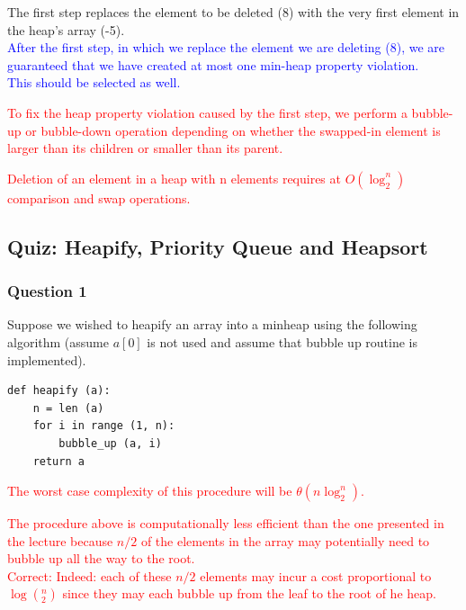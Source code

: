 \documentclass{article}
\begin{document}
The first step replaces the element to be deleted (8) with the very first element in the heap's array (-5).\\

\textcolor{blue}{After the first step, in which we replace the element we are deleting (8), we are guaranteed that we have created at most one min-heap property violation.\\
This should be selected as well.\\}

\textcolor{red}{To fix the heap property violation caused by the first step, we perform a bubble-up or bubble-down operation depending on whether the swapped-in element is larger than its children or smaller than its parent.\\}

\textcolor{red}{Deletion of an element in a heap with n elements requires at $O(\log_2^n)$ comparison and swap operations.\\}


\subsection{Quiz: Heapify, Priority Queue and Heapsort}


\subsubsection{Question 1}

Suppose we wished to heapify  an array into a minheap using the following algorithm (assume $a[0]$ is not used and assume that bubble up routine is implemented).\\

\begin{verbatim}
def heapify (a):
    n = len (a)
    for i in range (1, n):
        bubble_up (a, i)
    return a
\end{verbatim}

\textcolor{red}{The worst case complexity of this procedure will be $\theta(n\log_2^n)$.\\}

\textcolor{red}{The procedure above is computationally less efficient than the one presented in the lecture because $n/2$ of the elements in the array may potentially need to bubble up all the way to the root.\\
Correct: Indeed: each of these $n/2$ elements may incur a cost proportional to $\log(_2^n)$ since they may each bubble up from the leaf to the root of he heap.\\}
\end{document}
